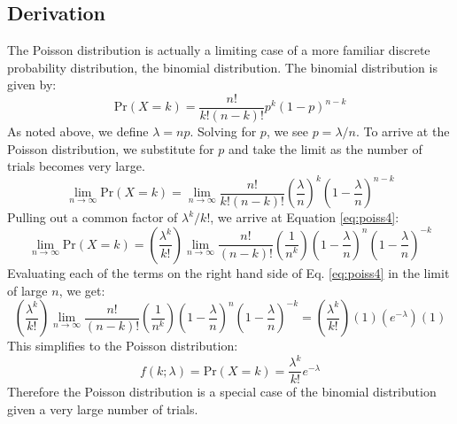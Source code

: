 \subsection{Derivation}  %
The Poisson distribution is actually a limiting case of a more familiar discrete probability distribution, the binomial distribution. The binomial distribution is given by:
\begin{equation}\label{eq:poiss2}
\mathrm{Pr}(X = k) = \frac{n!}{k!\left(n - k\right)!}p^k(1 - p)^{n - k}
\end{equation}
As noted above, we define $\lambda = np$.  Solving for $p$, we see $p = \lambda/n$. To arrive at the Poisson distribution, we substitute for $p$ and take the limit as the number of trials becomes very large.
\begin{equation}\label{eq:poiss3}
\lim_{n\to\infty} \mathrm{Pr}(X = k) = \lim_{n\to\infty}\frac{n!}{k!\left(n - k\right)!}\left(\frac{\lambda}{n}\right)^k\left(1 - \frac{\lambda}{n}\right)^{n - k}
\end{equation}
Pulling out a common factor of $\lambda^k/k!$, we arrive at Equation \ref{eq:poiss4}:
\begin{equation}\label{eq:poiss4}
\lim_{n\to\infty} \mathrm{Pr}(X = k) = \left(\frac{\lambda^k}{k!}\right) \lim_{n\to\infty} \frac{n!}{\left(n - k\right)!}\left(\frac{1}{n^k}\right)\left(1 - \frac{\lambda}{n}\right)^n\left(1 - \frac{\lambda}{n}\right)^{-k}
\end{equation}
Evaluating each of the terms on the right hand side of Eq. \ref{eq:poiss4} in the limit of large $n$, we get:
\begin{equation}\label{eq:poiss5}
\left(\frac{\lambda^k}{k!}\right) \lim_{n\to\infty} \frac{n!}{\left(n - k\right)!}\left(\frac{1}{n^k}\right)\left(1 - \frac{\lambda}{n}\right)^n\left(1 - \frac{\lambda}{n}\right)^{-k} = \left(\frac{\lambda^k}{k!}\right)\left(1\right)\left(e^{-\lambda}\right)\left(1\right)
\end{equation}
This simplifies to the Poisson distribution:
\begin{equation}\label{eq:poiss6}
f(k; \lambda) = \mathrm{Pr}(X = k) = \frac{\lambda^k}{k!}e^{-\lambda}
\end{equation}
Therefore the Poisson distribution is a special case of the binomial distribution given a very large number of trials.

